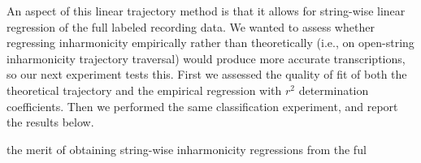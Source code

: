 \documentclass[12pt]{cmuthesis}
\begin{document}
An aspect of this linear trajectory method is that it allows for string-wise linear regression of the full labeled recording data. We wanted to assess whether regressing inharmonicity empirically rather than theoretically (i.e., on open-string inharmonicity trajectory traversal) would produce more accurate transcriptions, so our next experiment tests this. First we assessed the quality of fit of both the theoretical trajectory and the empirical regression with $r^2$ determination coefficients. Then we performed the same classification experiment, and report the results below.

the merit of obtaining string-wise inharmonicity regressions from the ful



\end{document}
